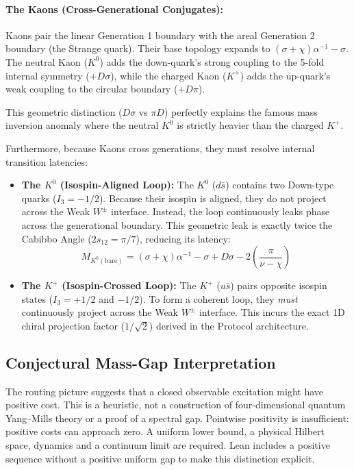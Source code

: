 \paragraph{The Kaons (Cross-Generational Conjugates):}
Kaons pair the linear Generation 1 boundary with the areal Generation 2 boundary (the Strange quark). Their base topology expands to $(\sigma+\chi)\alpha^{-1} - \sigma$. The neutral Kaon ($K^0$) adds the down-quark's strong coupling to the 5-fold internal symmetry ($+D\sigma$), while the charged Kaon ($K^+$) adds the up-quark's weak coupling to the circular boundary ($+D\pi$). 

This geometric distinction ($D\sigma$ vs $\pi D$) perfectly explains the famous mass inversion anomaly where the neutral $K^0$ is strictly heavier than the charged $K^+$.

Furthermore, because Kaons cross generations, they must resolve internal transition latencies:
\begin{itemize}
    \item \textbf{The $K^0$ (Isospin-Aligned Loop):} The $K^0$ ($d\bar{s}$) contains two Down-type quarks ($I_3 = -1/2$). Because their isospin is aligned, they do not project across the Weak $W^\pm$ interface. Instead, the loop continuously leaks phase across the generational boundary. This geometric leak is exactly twice the Cabibbo Angle ($2s_{12} = \pi/7$), reducing its latency:
    \begin{equation}
        M_{K^0 (\text{bare})} = (\sigma+\chi)\alpha^{-1} - \sigma + D\sigma - 2\left(\frac{\pi}{\nu-\chi}\right)
    \end{equation}

    \item \textbf{The $K^+$ (Isospin-Crossed Loop):} The $K^+$ ($u\bar{s}$) pairs opposite isospin states ($I_3 = +1/2$ and $-1/2$). To form a coherent loop, they \textit{must} continuously project across the Weak $W^\pm$ interface. This incurs the exact 1D chiral projection factor ($1/\sqrt{2}$) derived in the Protocol architecture.
\end{itemize}


\subsection{Conjectural Mass-Gap Interpretation}
The routing picture suggests that a closed observable excitation might have positive cost. This is a heuristic, not a construction of four-dimensional quantum Yang--Mills theory or a proof of a spectral gap. Pointwise positivity is insufficient: positive costs can approach zero. A uniform lower bound, a physical Hilbert space, dynamics and a continuum limit are required. Lean includes a positive sequence without a positive uniform gap to make this distinction explicit.

